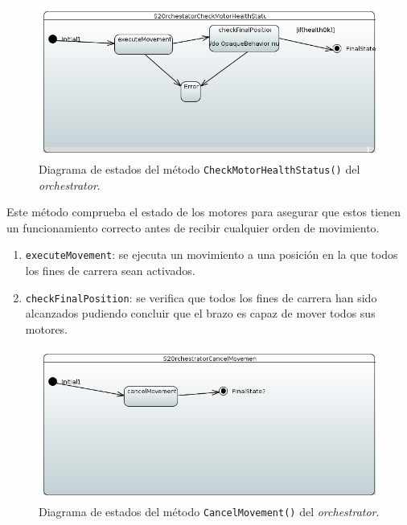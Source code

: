 \begin{figure}[H]
    \centering
    \includegraphics[width=1\linewidth]{pictures/S2OrchestratorCheckMotorHealthStatus.PNG}
    \caption{Diagrama de estados del método \texttt{CheckMotorHealthStatus()} del \textit{orchestrator}.}
    \label{fig:fun_check_motor_health_status_orchestrator}
\end{figure}

Este método comprueba el estado de los motores para asegurar que estos tienen un funcionamiento correcto antes de recibir cualquier orden de movimiento.

\begin{enumerate}
    \item \texttt{executeMovement}: se ejecuta un movimiento a una posición en la que todos los fines de carrera sean activados.
    \item \texttt{checkFinalPosition}: se verifica que todos los fines de carrera han sido alcanzados pudiendo concluir que el brazo es capaz de mover todos sus motores.
\end{enumerate}

\begin{figure}[H]
    \centering
    \includegraphics[width=1\linewidth]{pictures/S2OrchestratorCancelMovement.PNG}
    \caption{Diagrama de estados del método \texttt{CancelMovement()} del \textit{orchestrator}.}
    \label{fig:fun_cancel_movement_orchestrator}
\end{figure}

